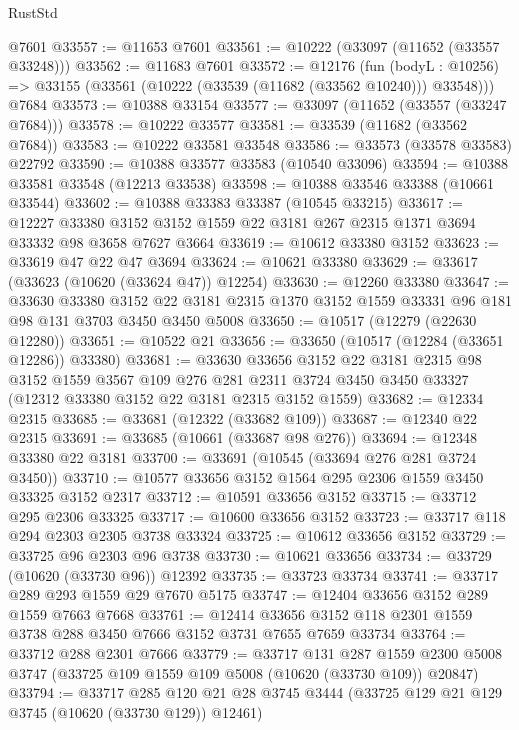 \begin{lexlean}{RustStd}
\begin{coremodule}
    @7601
@33557 := @11653 @7601
@33561 := @10222 (@33097 (@11652 (@33557 @33248)))
@33562 := @11683 @7601
@33572 := @12176
    (fun (bodyL : @10256) => @33155 (@33561 (@10222 (@33539 (@11682 (@33562 @10240))) @33548)))
    @7684
@33573 := @10388 @33154
@33577 := @33097 (@11652 (@33557 (@33247 @7684)))
@33578 := @10222 @33577
@33581 := @33539 (@11682 (@33562 @7684))
@33583 := @10222 @33581 @33548
@33586 := @33573 (@33578 @33583) @22792
@33590 := @10388 @33577 @33583 (@10540 @33096)
@33594 := @10388 @33581 @33548 (@12213 @33538)
@33598 := @10388 @33546 @33388 (@10661 @33544)
@33602 := @10388 @33383 @33387 (@10545 @33215)
@33617 := @12227
    @33380
    @3152
    @3152
    @1559
    @22
    @3181
    @267
    @2315
    @1371
    @3694
    @33332
    @98
    @3658
    @7627
    @3664
@33619 := @10612 @33380 @3152
@33623 := @33619 @47 @22 @47 @3694
@33624 := @10621 @33380
@33629 := @33617 (@33623 (@10620 (@33624 @47)) @12254)
@33630 := @12260 @33380
@33647 := @33630
    @33380
    @3152
    @22
    @3181
    @2315
    @1370
    @3152
    @1559
    @33331
    @96
    @181
    @98
    @131
    @3703
    @3450
    @3450
    @5008
@33650 := @10517 (@12279 (@22630 @12280))
@33651 := @10522 @21
@33656 := @33650 (@10517 (@12284 (@33651 @12286)) @33380)
@33681 := @33630
    @33656
    @3152
    @22
    @3181
    @2315
    @98
    @3152
    @1559
    @3567
    @109
    @276
    @281
    @2311
    @3724
    @3450
    @3450
    @33327
    (@12312 @33380 @3152 @22 @3181 @2315 @3152 @1559)
@33682 := @12334 @2315
@33685 := @33681 (@12322 (@33682 @109))
@33687 := @12340 @22 @2315
@33691 := @33685 (@10661 (@33687 @98 @276))
@33694 := @12348 @33380 @22 @3181
@33700 := @33691 (@10545 (@33694 @276 @281 @3724 @3450))
@33710 := @10577 @33656 @3152 @1564 @295 @2306 @1559 @3450 @33325 @3152 @2317
@33712 := @10591 @33656 @3152
@33715 := @33712 @295 @2306 @33325
@33717 := @10600 @33656 @3152
@33723 := @33717 @118 @294 @2303 @2305 @3738 @33324
@33725 := @10612 @33656 @3152
@33729 := @33725 @96 @2303 @96 @3738
@33730 := @10621 @33656
@33734 := @33729 (@10620 (@33730 @96)) @12392
@33735 := @33723 @33734
@33741 := @33717 @289 @293 @1559 @29 @7670 @5175
@33747 := @12404 @33656 @3152 @289 @1559 @7663 @7668
@33761 := @12414 @33656 @3152 @118 @2301 @1559 @3738 @288 @3450 @7666 @3152 @3731 @7655 @7659 @33734
@33764 := @33712 @288 @2301 @7666
@33779 := @33717
    @131
    @287
    @1559
    @2300
    @5008
    @3747
    (@33725 @109 @1559 @109 @5008 (@10620 (@33730 @109)) @20847)
@33794 := @33717
    @285
    @120
    @21
    @28
    @3745
    @3444
    (@33725 @129 @21 @129 @3745 (@10620 (@33730 @129)) @12461)

\end{coremodule}
\end{lexlean}

